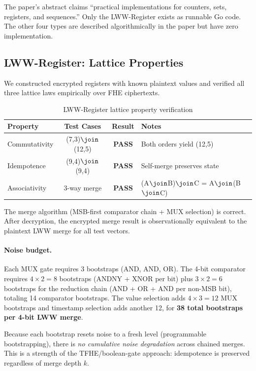 \documentclass{fhe-shared/luxfhe}
\begin{document}
The paper's abstract claims ``practical implementations for counters,
sets, registers, and sequences.''  Only the LWW-Register exists as
runnable Go code.  The other four types are described algorithmically
in the paper but have zero implementation.

\subsection{LWW-Register: Lattice Properties}

We constructed encrypted registers with known plaintext values and
verified all three lattice laws empirically over FHE ciphertexts.

\begin{table}[h]
\centering
\caption{LWW-Register lattice property verification}
\label{tab:lattice}
\begin{tabular}{lccl}
\toprule
Property        & Test Cases & Result & Notes \\
\midrule
Commutativity   & (7,3)$\join$(12,5) & \textbf{PASS} & Both orders yield (12,5) \\
Idempotence     & (9,4)$\join$(9,4)  & \textbf{PASS} & Self-merge preserves state \\
Associativity   & 3-way merge        & \textbf{PASS} & (A$\join$B)$\join$C = A$\join$(B$\join$C) \\
\bottomrule
\end{tabular}
\end{table}

The merge algorithm (MSB-first comparator chain + MUX selection) is
correct.  After decryption, the encrypted merge result is
observationally equivalent to the plaintext LWW merge for all test
vectors.

\paragraph{Noise budget.}
Each MUX gate requires 3 bootstraps (AND, AND, OR).  The 4-bit
comparator requires $4 \times 2 = 8$ bootstraps (ANDNY + XNOR per
bit) plus $3 \times 2 = 6$ bootstraps for the reduction chain (AND +
OR + AND per non-MSB bit), totaling 14 comparator bootstraps.  The
value selection adds $4 \times 3 = 12$ MUX bootstraps and timestamp
selection adds another 12, for \textbf{38 total bootstraps per
4-bit LWW merge}.

Because each bootstrap resets noise to a fresh level (programmable
bootstrapping), there is \emph{no cumulative noise degradation} across
chained merges.  This is a strength of the TFHE/boolean-gate approach:
idempotence is preserved regardless of merge depth $k$.
\end{document}
